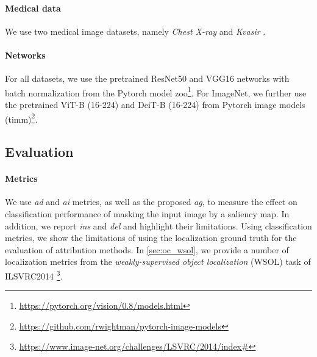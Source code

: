 \paragraph{Medical data}

We use two medical image datasets, namely \emph{Chest X-ray} \autocite{kermany2018labeled} and 
\emph{Kvasir} \autocite{pogorelov2017kvasir}. 


\paragraph{Networks}
\label{sec:oc_setup}

For all datasets, we use the pretrained ResNet50 \autocite{he2016deep} and VGG16 
\autocite{simonyan2015deep} networks with batch normalization \autocite{ioffe2015batch} from the 
Pytorch model zoo\footnote{\url{https://pytorch.org/vision/0.8/models.html}}. For ImageNet, we 
further use the pretrained ViT-B (16-224) \autocite{dosovitskiy2020image} and DeiT-B (16-224) 
\autocite{pmlr-v139-touvron21a} from Pytorch image models (timm)\footnote{\url{
    https://github.com/rwightman/pytorch-image-models}}.



\subsection{Evaluation}
\label{sec:eval}

\paragraph{Metrics}
We use \emph{\gls{ad}} and \emph{\gls{ai}} \autocite{chattopadhay2018grad} metrics, as well 
as the proposed \emph{\gls{ag}}, to measure the effect on classification performance of masking 
the input image by a saliency map. In addition, we report \emph{\gls{ins}} and \emph{\gls{del}}  
\autocite{petsiuk2018rise} and highlight their limitations. Using classification metrics, we show 
the limitations of using the localization ground truth for the evaluation of attribution methods. 
In \autoref{sec:oc_wsol}, we provide a number of localization metrics from the 
\emph{weakly-supervised object localization} (WSOL) task of ILSVRC2014
\footnote{\url{https://www.image-net.org/challenges/LSVRC/2014/index\#}}.

